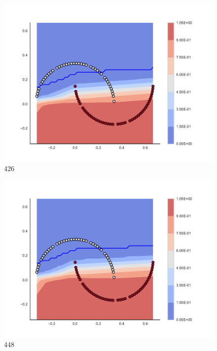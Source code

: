 \begin{subfigure}[b]{0.09\textwidth}
    \includegraphics[clip, trim=2.35cm 1.75cm 4.5cm 0cm,width=\textwidth]{img/convergence/426.pdf}
    \caption{426}
    \label{fig:convergence_426}
\end{subfigure}
%
\begin{subfigure}[b]{0.09\textwidth}
    \includegraphics[clip, trim=2.35cm 1.75cm 4.5cm 0cm,width=\textwidth]{img/convergence/448.pdf}
    \caption{448}
    \label{fig:convergence_448}
\end{subfigure}
%
